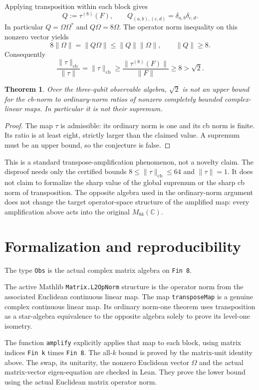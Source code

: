 \documentclass[11pt]{article}
\newtheorem{theorem}{Theorem}
\newcommand{\cb}{\mathrm{cb}}
\begin{document}
Applying transposition within each block gives
\[
 Q:=\tau^{(8)}(F),\qquad
 Q_{(a,b),(c,d)}=\delta_{a,b}\delta_{c,d}.
\]
In particular $Q=\Omega\Omega^*$ and $Q\Omega=8\Omega$.
The operator norm inequality on this nonzero vector yields
\[
 8\|\Omega\|=\|Q\Omega\|\leq\|Q\|\|\Omega\|,
 \qquad \|Q\|\geq8.
\]
Consequently
\[
 \frac{\|\tau\|_{\cb}}{\|\tau\|}
 =\|\tau\|_{\cb}\geq\frac{\|\tau^{(8)}(F)\|}{\|F\|}
 \geq8>\sqrt2.
\]

\begin{theorem}
Over the three-qubit observable algebra, $\sqrt2$ is not
an upper bound for the cb-norm to ordinary-norm ratios
of nonzero completely bounded complex-linear maps.
In particular it is not their supremum.
\end{theorem}
\begin{proof}
The map $\tau$ is admissible: its ordinary norm is one
and its cb norm is finite. Its ratio is at least eight,
strictly larger than the claimed value. A supremum must
be an upper bound, so the conjecture is false.
\end{proof}

This is a standard transpose-amplification phenomenon,
not a novelty claim. The disproof needs only the certified
bounds $8\leq\|\tau\|_{\cb}\leq64$ and $\|\tau\|=1$.
It does not claim to formalize the sharp value of the
global supremum or the sharp cb norm of transposition.
The opposite algebra used in the ordinary-norm argument
does not change the target operator-space structure of
the amplified map: every amplification above acts into
the original $M_{8k}(\mathbb C)$.

\newpage
\section*{Formalization and reproducibility}
The type \texttt{Obs} is the actual complex matrix algebra
on \texttt{Fin 8}.

The active Mathlib
\texttt{Matrix.L2OpNorm} structure is the operator norm
from the associated Euclidean continuous linear map.
The map \texttt{transposeMap} is a genuine complex
continuous linear map. Its ordinary norm-one theorem
uses transposition as a star-algebra equivalence to the
opposite algebra solely to prove its level-one isometry.

The function \texttt{amplify} explicitly applies that map
to each block, using matrix indices
\texttt{Fin k} times \texttt{Fin 8}. The all-$k$ bound
is proved by the matrix-unit identity above. The swap,
its unitarity, the nonzero Euclidean vector $\Omega$ and
the actual matrix-vector eigen-equation are checked in
Lean. They prove the lower bound using the actual
Euclidean matrix operator norm.
\end{document}
